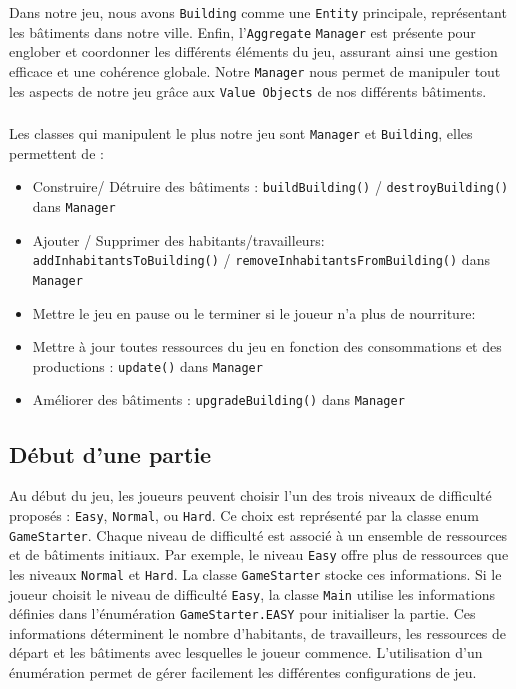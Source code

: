 \documentclass[a4paper,11pt]{article}
\begin{document}
Dans notre jeu, nous avons \texttt{Building} comme une \texttt{Entity} principale, représentant les bâtiments dans notre ville. Enfin, l'\texttt{Aggregate} \texttt{Manager} est présente pour englober et coordonner les différents éléments du jeu, assurant ainsi une gestion efficace et une cohérence globale. Notre \texttt{Manager} nous permet de manipuler tout les aspects de notre jeu grâce aux \texttt{Value Objects} de nos différents bâtiments.

\subsubsection*{}
Les classes qui manipulent le plus notre jeu sont \texttt{Manager} et \texttt{Building}, elles permettent de :
\begin{itemize}
	\item Construire/ Détruire des bâtiments : \texttt{buildBuilding()} / \texttt{destroyBuilding()} dans \texttt{Manager}
	\item Ajouter / Supprimer des habitants/travailleurs: \texttt{addInhabitantsToBuilding()} / \texttt{removeInhabitantsFromBuilding()} dans \texttt{Manager}
	\item Mettre le jeu en pause ou le terminer si le joueur n'a plus de nourriture: \texttt{}
	\item Mettre à jour toutes ressources du jeu en fonction des consommations et des productions : \texttt{update()} dans \texttt{Manager}
	\item Améliorer des bâtiments : \texttt{upgradeBuilding()} dans \texttt{Manager}
\end{itemize}

\clearpage

\subsection{Début d'une partie}
\par Au début du jeu, les joueurs peuvent choisir l'un des trois niveaux de difficulté proposés : \texttt{Easy}, \texttt{Normal}, ou \texttt{Hard}. Ce choix est représenté par la classe enum \texttt{GameStarter}. Chaque niveau de difficulté est associé à un ensemble de ressources et de bâtiments initiaux. Par exemple, le niveau \texttt{Easy} offre plus de ressources que les niveaux \texttt{Normal} et \texttt{Hard}. La classe \texttt{GameStarter} stocke ces informations. Si le joueur choisit le niveau de difficulté \texttt{Easy}, la classe \texttt{Main} utilise les informations définies dans l'énumération \texttt{GameStarter.EASY} pour initialiser la partie. Ces informations déterminent le nombre d'habitants, de travailleurs, les ressources de départ et les bâtiments avec lesquelles le joueur commence. L'utilisation d'un énumération permet de gérer facilement les différentes configurations de jeu.
\end{document}
